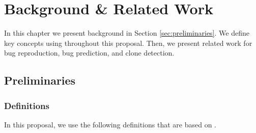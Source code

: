 
\chapter{Background \& Related Work\label{chap:relwork}}

In this chapter we present background  in Section \ref{sec:preliminaries}. We define key concepts using throughout this proposal.
Then, we present related work for bug reproduction, bug prediction, and clone detection.

\section{Preliminaries\label{sec:preliminaries}}

\subsection{Definitions\label{sec:version-control}}
In this proposal, we use the following definitions that are based on  \cite{Avizienis2004,Pratt2001,Burnstein2006,Radatz1990,Whittaker2012}.

